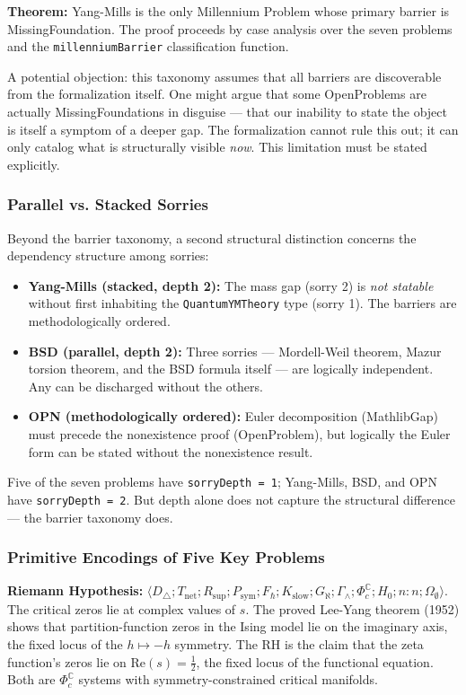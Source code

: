 \documentclass[12pt,a4paper]{article}
\begin{document}
\textbf{Theorem:} Yang-Mills is the only Millennium Problem whose primary barrier is MissingFoundation. The proof proceeds by case analysis over the seven problems and the \texttt{millenniumBarrier} classification function.

A potential objection: this taxonomy assumes that all barriers are discoverable from the formalization itself. One might argue that some OpenProblems are actually MissingFoundations in disguise --- that our inability to state the object is itself a symptom of a deeper gap. The formalization cannot rule this out; it can only catalog what is structurally visible \emph{now}. This limitation must be stated explicitly.

\subsubsection{Parallel vs. Stacked Sorries}

Beyond the barrier taxonomy, a second structural distinction concerns the dependency structure among sorries:

\begin{itemize}
    \item \textbf{Yang-Mills (stacked, depth 2):} The mass gap (sorry 2) is \emph{not statable} without first inhabiting the \texttt{QuantumYMTheory} type (sorry 1). The barriers are methodologically ordered.
    \item \textbf{BSD (parallel, depth 2):} Three sorries --- Mordell-Weil theorem, Mazur torsion theorem, and the BSD formula itself --- are logically independent. Any can be discharged without the others.
    \item \textbf{OPN (methodologically ordered):} Euler decomposition (MathlibGap) must precede the nonexistence proof (OpenProblem), but logically the Euler form can be stated without the nonexistence result.
\end{itemize}

Five of the seven problems have \texttt{sorryDepth = 1}; Yang-Mills, BSD, and OPN have \texttt{sorryDepth = 2}. But depth alone does not capture the structural difference --- the barrier taxonomy does.

\subsubsection{Primitive Encodings of Five Key Problems}

\textbf{Riemann Hypothesis:} $\langle D_{\triangle}; T_{\text{net}}; R_{\text{sup}}; P_{\text{sym}}; F_{\hbar}; K_{\text{slow}}; G_{\aleph}; \Gamma_{\wedge}; \Phi_c^\mathbb{C}; H_0; n{:}n; \Omega_{\emptyset} \rangle$. The critical zeros lie at complex values of $s$. The proved Lee-Yang theorem (1952) shows that partition-function zeros in the Ising model lie on the imaginary axis, the fixed locus of the $h \mapsto -h$ symmetry. The RH is the claim that the zeta function's zeros lie on $\text{Re}(s) = \frac{1}{2}$, the fixed locus of the functional equation. Both are $\Phi_c^\mathbb{C}$ systems with symmetry-constrained critical manifolds.
\end{document}
